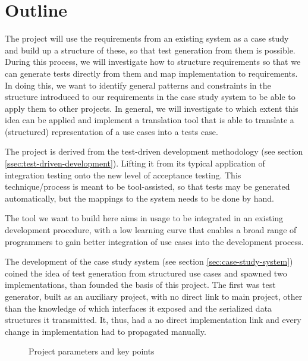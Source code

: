 \section{Outline}
\noindent The project will use the requirements from an existing system as a case study and build up a structure of these, so that test generation from them is possible. During this process, we will investigate how to structure requirements so that we can generate tests directly from them and map implementation to requirements. In doing this, we want to identify general patterns and constraints in the structure introduced to our requirements in the case study system to be able to apply them to other projects. In general, we will investigate to which extent this idea can be applied and implement a translation tool that is able to translate a (structured) representation of a use cases into a tests case.\medskip

\noindent The project is derived from the test-driven development methodology (see section \ref{ssec:test-driven-development}). Lifting it from its typical application of integration testing onto the new level of acceptance testing. This technique/process is meant to be tool-assisted, so that tests may be generated automatically, but the mappings to the system needs to be done by hand.\medskip

\noindent The tool we want to build here aims in usage to be integrated in an existing development procedure, with a low learning curve that enables a broad range of programmers to gain better integration of use cases into the development process.\medskip

\noindent The development of the case study system (see section \ref{sec:case-study-system}) coined the idea of test generation from structured use cases and spawned two implementations, than founded the basis of this project. The first was test generator, built as an auxiliary project, with no direct link to main project, other than the knowledge of which interfaces it exposed and the serialized data structures it transmitted. It, thus, had a no direct implementation link and every change in implementation had to propagated manually.\medskip

\begin{figure}[!htbp]
\centering
{}
\caption{Project parameters and key points}
\label{fig:project_parameter_plot}
\end{figure}

